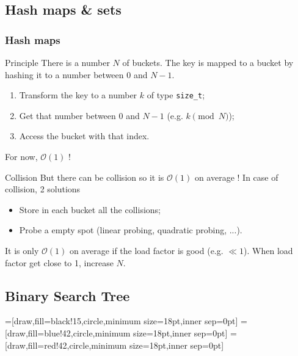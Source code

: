 \documentclass[10pt,svgnames,usenames,table]{beamer} %
\newcommand{\bigoh}{\mathcal{O}}
\begin{document}
\subsection{Hash maps \& sets}
\begin{frame}[allowframebreaks]
  \frametitle{Hash maps}
  \begin{block}{Principle}
    There is a number $N$ of buckets. The key is mapped to a bucket by hashing it to a number between $0$ and $N-1$.
    \begin{enumerate}
      \item Transform the key to a number $k$ of type \lstinline|size_t|;
      \item Get that number between $0$ and $N-1$ (e.g. $k \pmod{N}$);
      \item Access the bucket with that index.
    \end{enumerate}
    For now, $\bigoh(1)$ !
  \end{block}
  \begin{block}{Collision}
    But there can be collision so it is $\bigoh(1)$ on average !
    In case of collision, 2 solutions
    \begin{itemize}
      \item Store in each bucket all the collisions;
      \item Probe a empty spot (linear probing, quadratic probing, ...).
    \end{itemize}
  \end{block}
  It is only $\bigoh(1)$ on average if the load factor is good (e.g. $\ll 1$).
  When load factor get close to 1, increase $N$.
\end{frame}

\subsection{Binary Search Tree}

=[draw,fill=black!15,circle,minimum size=18pt,inner sep=0pt]
=[draw,fill=blue!42,circle,minimum size=18pt,inner sep=0pt]
=[draw,fill=red!42,circle,minimum size=18pt,inner sep=0pt]
\end{document}
